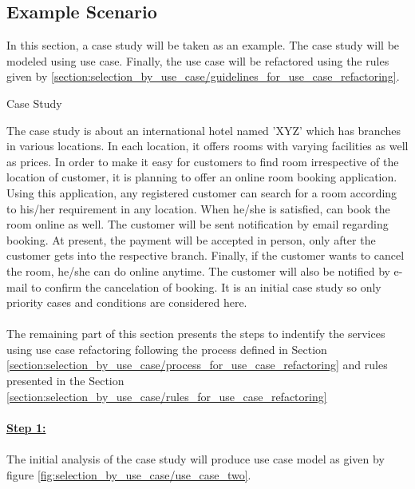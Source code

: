 \subsection{Example Scenario}\label{section:selection_by_use_case/refactoring_example}
In this section, a case study will be taken as an example. The case study will be modeled using use case. Finally, the use case will be refactored using the rules given by \ref{section:selection_by_use_case/guidelines_for_use_case_refactoring}.
\\
\begin{shaded} Case Study \end{shaded}
The case study is about an international hotel named 'XYZ' which has branches in various locations. In each location, it offers rooms with varying facilities as well as prices. In order to make it easy for customers to find room irrespective of the location of customer, it is planning to offer an online room booking application. Using this application, any registered customer can search for a room according to his/her requirement in any location. When he/she is satisfied, can book the room online as well. The customer will be sent notification by email regarding booking. At present, the payment will be accepted in person, only after the customer gets into the respective branch. Finally, if the customer wants to cancel the room, he/she can do online anytime. The customer will also be notified by e-mail to confirm the cancelation of booking. It is an initial case study so only priority cases and conditions are considered here.
\\
\\
The remaining part of this section presents the steps to indentify the services using use case refactoring following the process defined in Section \ref{section:selection_by_use_case/process_for_use_case_refactoring} and rules presented in the Section \ref{section:selection_by_use_case/rules_for_use_case_refactoring}
\\
\\
\textbf{\underline{Step 1:}}
\\
\\
The initial analysis of the case study will produce use case model as given by figure \ref{fig:selection_by_use_case/use_case_two}.

